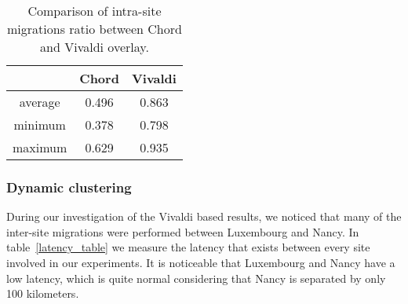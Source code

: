 \begin{table}

  \begin{center}
    \begin{tabular}{|c|c|c|}   

      \hline \multicolumn{1}{|p{3cm}|}{ }
       & \multicolumn{1}{|p{3cm}|}{\centering Chord }  & \multicolumn{1}{|p{3cm}|}{ \centering Vivaldi}  \\

      \hline
      average & 0.496 & 0.863 \\

      \hline
      minimum & 0.378 & 0.798 \\

      \hline
      maximum & 0.629 & 0.935 \\

      \hline
    \end{tabular}
  \end{center}
  \caption{\label{migration_table} Comparison of intra-site migrations ratio between Chord and Vivaldi overlay.}
\end{table}

\subsubsection{Dynamic clustering}

During our investigation of the Vivaldi based results, we noticed that many of
the inter-site migrations were performed between Luxembourg and Nancy. In 
table~\ref{latency_table} we measure the latency that exists between every site
involved in our experiments. It is noticeable that Luxembourg and Nancy have a
low latency, which is quite normal considering that Nancy is separated by only
100 kilometers.


